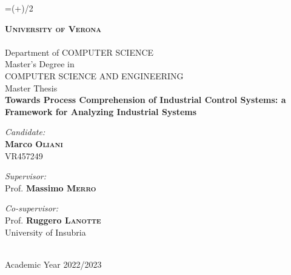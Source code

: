 
\newcommand{\thesistitle}{Towards Process Comprehension of Industrial Control Systems: a Framework for Analyzing Industrial Systems}
\newcommand{\supervisor}{Prof. \textbf{Massimo \textsc{Merro}}}
\newcommand{\firstcosupervisor}{Prof. \textbf{Ruggero \textsc{Lanotte}}\\University of Insubria}
\newcommand{\secondcosupervisor}{\textbf{Marco \textsc{Lucchese}}}
\newcommand{\opponent}{Prof. \textbf{Mariano \textsc{Ceccato}}}
\newcommand{\candidate}{\textbf{Marco \textsc{Oliani}}\\VR457249}
\newcommand{\academicyear}{\normalsize Academic Year 2022/2023}

\begin{titlepage}
	\oddsidemargin=\dimexpr(\oddsidemargin+\evensidemargin)/2\relax
	\begin{center}
		\thispagestyle{empty}
		
		
		\textsc{\Large\bfseries University of Verona}\\
		\hrulefill \\[0.1cm]
		\large Department of \textsc{COMPUTER SCIENCE}\\[1.0cm]
		
		\normalsize Master's Degree in \\
		\normalsize\textsc{COMPUTER SCIENCE AND ENGINEERING}\\[1.5cm]
		
		\large Master Thesis \\[1.0cm]
		
		{ \Large\bfseries\thesistitle} \\[3.0cm]
		
		\begin{minipage}[t]{0.45\textwidth}
			\begin{flushleft} \normalsize
				\emph{Candidate:} \\
				\candidate
			\end{flushleft}
		\end{minipage}
		\begin{minipage}[t]{0.45\textwidth}\raggedleft
			\begin{flushright} \normalsize
				\emph{Supervisor:}\\
				\supervisor 
			\end{flushright}
			\begin{flushright} \normalsize
				\emph{Co-supervisor:}\\
				\firstcosupervisor \\
			\end{flushright}
		\end{minipage}
		
		\vfill
		
		\hrulefill \\[0.1cm]
		\academicyear
		
	\end{center}
\end{titlepage}

\thispagestyle{empty}